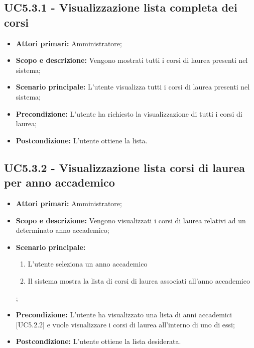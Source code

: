 \documentclass[AnalisiDeiRequisiti.tex]{subfiles}
\begin{document}
\subsection{UC5.3.1 - Visualizzazione lista completa dei corsi}
\begin{itemize}
	\item \textbf{Attori primari:} Amministratore;
	\item \textbf{Scopo e descrizione:} Vengono mostrati tutti i corsi di laurea presenti nel sistema;
	\item \textbf{Scenario principale:} L'utente visualizza tutti i corsi di laurea presenti nel sistema;
	\item \textbf{Precondizione:} L'utente ha richiesto la visualizzazione di tutti i corsi di laurea; 
	\item \textbf{Postcondizione:} L'utente ottiene la lista.
\end{itemize}
\subsection{UC5.3.2 - Visualizzazione lista corsi di laurea per anno accademico}
\begin{itemize}
	\item \textbf{Attori primari:} Amministratore;
	\item \textbf{Scopo e descrizione:} Vengono visualizzati i corsi di laurea relativi ad un determinato anno accademico;
	\item \textbf{Scenario principale:}
	\begin{enumerate}
		\item L'utente seleziona un anno accademico
		\item Il sistema mostra la lista di corsi di laurea associati all'anno accademico
	\end{enumerate};
	\item \textbf{Precondizione:} L'utente ha visualizzato una lista di anni accademici [UC5.2.2] e vuole visualizzare i corsi di laurea all'interno di uno di essi; 
	\item \textbf{Postcondizione:} L'utente ottiene la lista desiderata.
\end{itemize}
\end{document}
